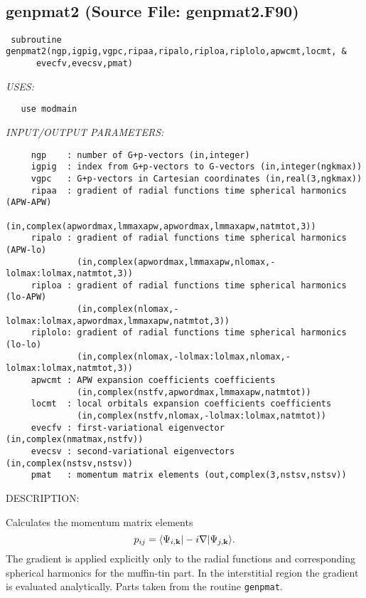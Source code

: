 \documentclass[11pt]{article}
\begin{document}
 
 
\mbox{}\hrulefill\ 
 
\subsection{genpmat2 (Source File: genpmat2.F90)}


\begin{verbatim} subroutine genpmat2(ngp,igpig,vgpc,ripaa,ripalo,riploa,riplolo,apwcmt,locmt, &
      evecfv,evecsv,pmat)\end{verbatim}{\em USES:}
\begin{verbatim}   use modmain\end{verbatim}{\em INPUT/OUTPUT PARAMETERS:}
\begin{verbatim}     ngp    : number of G+p-vectors (in,integer)
     igpig  : index from G+p-vectors to G-vectors (in,integer(ngkmax))
     vgpc   : G+p-vectors in Cartesian coordinates (in,real(3,ngkmax))
     ripaa  : gradient of radial functions time spherical harmonics (APW-APW)
              (in,complex(apwordmax,lmmaxapw,apwordmax,lmmaxapw,natmtot,3))
     ripalo : gradient of radial functions time spherical harmonics (APW-lo)
              (in,complex(apwordmax,lmmaxapw,nlomax,-lolmax:lolmax,natmtot,3))
     riploa : gradient of radial functions time spherical harmonics (lo-APW)
              (in,complex(nlomax,-lolmax:lolmax,apwordmax,lmmaxapw,natmtot,3))
     riplolo: gradient of radial functions time spherical harmonics (lo-lo)
              (in,complex(nlomax,-lolmax:lolmax,nlomax,-lolmax:lolmax,natmtot,3))
     apwcmt : APW expansion coefficients coefficients
              (in,complex(nstfv,apwordmax,lmmaxapw,natmtot))
     locmt  : local orbitals expansion coefficients coefficients
              (in,complex(nstfv,nlomax,-lolmax:lolmax,natmtot))
     evecfv : first-variational eigenvector (in,complex(nmatmax,nstfv))
     evecsv : second-variational eigenvectors (in,complex(nstsv,nstsv))
     pmat   : momentum matrix elements (out,complex(3,nstsv,nstsv))\end{verbatim}
{\sf DESCRIPTION:\\ }


     Calculates the momentum matrix elements
     $$ p_{ij}=\langle\Psi_{i,{\bf k}}|-i\nabla|\Psi_{j,{\bf k}}\rangle. $$
     The gradient is applied explicitly only to the radial functions and 
     corresponding spherical harmonics for the muffin-tin part. In the 
     interstitial region the gradient is evaluated analytically.
     Parts taken from the routine {\tt genpmat}.
  
\end{document}
